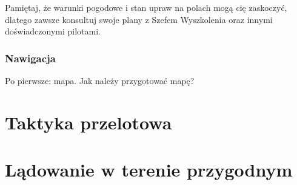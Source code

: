 \documentclass{article}
\begin{document}
Pamiętaj, że warunki pogodowe i stan upraw na polach mogą cię zaskoczyć,
dlatego zawsze konsultuj swoje plany z Szefem Wyszkolenia oraz innymi
doświadczonymi pilotami.

\subsubsection{Nawigacja}
Po pierwsze: mapa. Jak należy przygotować mapę?
\newpage

\section{Taktyka przelotowa}
\newpage

\section{Lądowanie w terenie przygodnym}
\end{document}

